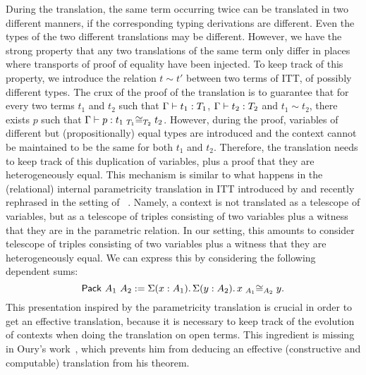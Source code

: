 During the translation, the same term occurring twice can be
translated in two different manners, if the corresponding typing
derivations are different. Even the types of the two different
translations may be different.
%
However, we have the strong property that any two translations of the
same term only differ in places where transports of proof of equality have been
injected.
%
To keep track of this property, we introduce the relation $t \sim t'$
between two terms of ITT, of possibly different types.
%
The crux of the proof of the translation is to guarantee that for
every two terms $t_1$ and $t_2$ such that $\isterm{\Ga}{t_1}{T_1}$,
  $\isterm{\Ga}{t_2}{T_2}$ and $t_1 \sim t_2$, there exists $p$ such
  that
  $\isterm{\Ga} {p} {\Heq{{T_1}} {{t_1}} {{T_2}} {{t_2}}}$.
%
However, during the proof, variables of different but (propositionally) equal
types are introduced and the context cannot be maintained to be the same
for both $t_1$ and $t_2$. Therefore, the translation needs to keep
track of this duplication of variables, plus a proof that they are
heterogeneously equal.
%
This mechanism is similar to what happens in the (relational) internal
parametricity translation in ITT introduced by
\cite{bernardy2012proofs} and recently rephrased in the setting of
\TemplateCoq~\cite{DBLP:conf/itp/AnandBCST18}. Namely, a context is not
translated as a telescope of variables, but as a telescope of triples
consisting of two variables plus a witness that they are in the
parametric relation.
%
In our setting, this amounts to consider telescope of triples
consisting of two variables plus a witness that they are
heterogeneously equal. We can express this by considering the
following dependent sums:
\[
\Pack{A_1}{A_2} := \Sum{x:A_1} \Sum{y:A_2} \Heq{A_1}{x}{A_2}{y}.
\]
%
This presentation inspired by the parametricity translation is crucial
in order to get an effective translation, because it is necessary to
keep track of the evolution of contexts when doing the translation on
open terms.
%
This ingredient is missing in Oury's work~\cite{oury2005extensionality},
which prevents him from deducing an effective (\ie constructive and
computable) translation from his theorem.



